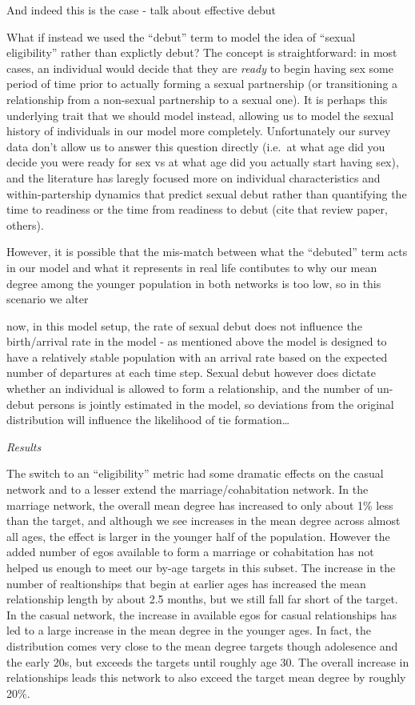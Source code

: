 \documentclass [11pt, proquest] {uwthesis}[2015/03/03]
\begin{document}
And indeed this is the case - talk about effective debut

What if instead we used the ``debut'' term to model the idea of ``sexual
eligibility'' rather than explictly debut? The concept is
straightforward: in most cases, an individual would decide that they are
\emph{ready} to begin having sex some period of time prior to actually
forming a sexual partnership (or transitioning a relationship from a
non-sexual partnership to a sexual one). It is perhaps this underlying
trait that we should model instead, allowing us to model the sexual
history of individuals in our model more completely. Unfortunately our
survey data don't allow us to answer this question directly (i.e.~at
what age did you decide you were ready for sex vs at what age did you
actually start having sex), and the literature has laregly focused more
on individual characteristics and within-partership dynamics that
predict sexual debut rather than quantifying the time to readiness or
the time from readiness to debut (cite that review paper, others).

However, it is possible that the mis-match between what the ``debuted''
term acts in our model and what it represents in real life contibutes to
why our mean degree among the younger population in both networks is too
low, so in this scenario we alter

now, in this model setup, the rate of sexual debut does not influence
the birth/arrival rate in the model - as mentioned above the model is
designed to have a relatively stable population with an arrival rate
based on the expected number of departures at each time step. Sexual
debut however does dictate whether an individual is allowed to form a
relationship, and the number of un-debut persons is jointly estimated in
the model, so deviations from the original distribution will influence
the likelihood of tie formation\ldots{}

\emph{Results}

The switch to an ``eligibility'' metric had some dramatic effects on the
casual network and to a lesser extend the marriage/cohabitation network.
In the marriage network, the overall mean degree has increased to only
about 1\% less than the target, and although we see increases in the
mean degree across almost all ages, the effect is larger in the younger
half of the population. However the added number of egos available to
form a marriage or cohabitation has not helped us enough to meet our
by-age targets in this subset. The increase in the number of
realtionships that begin at earlier ages has increased the mean
relationship length by about 2.5 months, but we still fall far short of
the target. In the casual network, the increase in available egos for
casual relationships has led to a large increase in the mean degree in
the younger ages. In fact, the distribution comes very close to the mean
degree targets though adolesence and the early 20s, but exceeds the
targets until roughly age 30. The overall increase in relationships
leads this network to also exceed the target mean degree by roughly
20\%.
\end{document}
